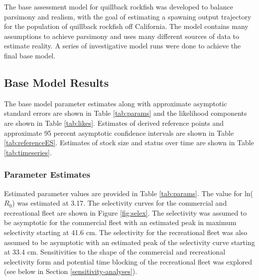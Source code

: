 \documentclass[11pt,
  english,
  a4paper,
]{article}
\begin{document}
\leavevmode\tagmcend\tagstructend


The base assessment model for quillback rockfish was developed to balance parsimony and realism, with the goal of estimating a spawning output trajectory for the population of quillback rockfish off California. The model contains many assumptions to achieve parsimony and uses many different sources of data to estimate reality. A series of investigative model runs were done to achieve the final base model.

\leavevmode\tagmcend\tagstructend\par


\hypertarget{base-model-results}{%
\subsection{Base Model Results}\label{base-model-results}}

\leavevmode\tagmcend\tagstructend


The base model parameter estimates along with approximate asymptotic standard errors are shown in Table \ref{tab:params} and the likelihood components are shown in Table \ref{tab:likes}. Estimates of derived reference points and approximate 95 percent asymptotic confidence intervals are shown in Table \ref{tab:referenceES}. Estimates of stock size and status over time are shown in Table \ref{tab:timeseries}.

\leavevmode\tagmcend\tagstructend\par


\hypertarget{parameter-estimates}{%
\subsubsection{Parameter Estimates}\label{parameter-estimates}}

\leavevmode\tagmcend\tagstructend


Estimated parameter values are provided in Table \ref{tab:params}. The value for ln({\(R_0\)\leavevmode\tagmcend\tagstructend}) was estimated at 3.17. The selectivity curves for the commercial and recreational fleet are shown in Figure \ref{fig:selex}. The selectivity was assumed to be asymptotic for the commercial fleet with an estimated peak in maximum selectivity starting at 41.6 cm. The selectivity for the recreational fleet was also assumed to be asymptotic with an estimated peak of the selectivity curve starting at 33.4 cm. Sensitivities to the shape of the commercial and recreational selectivity form and potential time blocking of the recreational fleet was explored (see below in Section \ref{sensitivity-analyses}).
\end{document}
